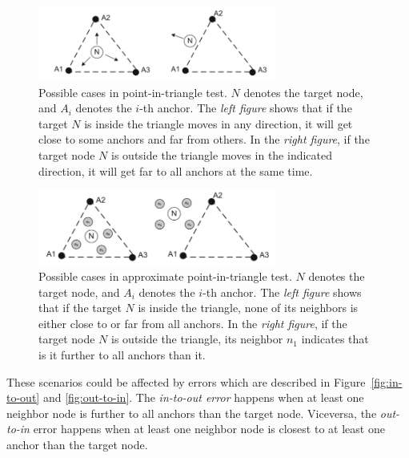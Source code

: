 \documentclass[a4paper,12pt]{article}
\begin{document}
\begin{enumerate}[label=(\alph*)]
\begin{enumerate}[label=(\roman*)]
    \begin{figure}[H]
      \centering
      \includegraphics[width=0.7\textwidth]{img/pit-test}
      \caption{\label{fig:pit-test}Possible cases in point-in-triangle test. $N$ denotes the target node, and $A_i$ denotes the $i$-th anchor. The \textit{left figure} shows that if the target $N$ is inside the triangle moves in any direction, it will get close to some anchors and far from others. In the \textit{right figure}, if the target node $N$ is outside the triangle moves in the indicated direction, it will get far to all anchors at the same time.}
    \end{figure}

    \begin{figure}[H]
      \centering
      \includegraphics[width=0.7\textwidth]{img/apit-test}
      \caption{\label{fig:apit-test}Possible cases in approximate point-in-triangle test. $N$ denotes the target node, and $A_i$ denotes the $i$-th anchor. The \textit{left figure} shows that if the target $N$ is inside the triangle, none of its neighbors is either close to or far from all anchors. In the \textit{right figure}, if the target node $N$ is outside the triangle, its neighbor $n_1$ indicates that is it further to all anchors than it.}
    \end{figure}

    These scenarios could be affected by errors which are described in Figure~\ref{fig:in-to-out} and \ref{fig:out-to-in}. The \textit{in-to-out error} happens when at least one neighbor node is further to all anchors than the target node. Viceversa, the \textit{out-to-in} error happens when at least one neighbor node is closest to at least one anchor than the target node.


\end{enumerate}
\end{enumerate}
\end{document}
